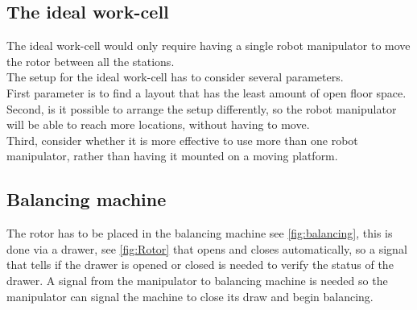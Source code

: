 \subsection{The ideal work-cell}
The ideal work-cell would only require having a single robot manipulator to move the rotor between all the stations.\\
 The setup for the ideal work-cell has to consider several parameters.\\
 First parameter is to find a layout that has the least amount of open floor space.\\
 Second, is it possible to arrange the setup differently, so the robot manipulator will be able to reach more locations, without having to move.\\
 Third, consider whether it is more effective to use more than one robot manipulator, rather than having it mounted on a moving platform.
 
 \subsection{Balancing machine}
 The rotor has to be placed in the balancing machine see \ref{fig:balancing}, this is done via a drawer, see \ref{fig:Rotor} that opens and closes automatically, so a signal that tells if the drawer is opened or closed is needed to verify the status of the drawer. A signal from the manipulator to balancing machine is needed so the manipulator can signal the machine to close its draw and begin balancing.\\
 
